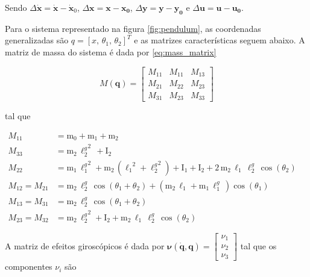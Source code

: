 \documentclass[a4paper, twoside, fleqn]{article}
\begin{document}
    Sendo $\Delta \mathbf{\dot x} = \mathbf{\dot x} - \mathbf{\dot x}_0$, $\Delta \mathbf{x} = \mathbf{x} - \mathbf{x_0}$, $\Delta \mathbf{y} = \mathbf{y} - \mathbf{y_0}$ e $\Delta \mathbf{u} = \mathbf{u} - \mathbf{u_0}$. 
    
    Para o sistema representado na figura \ref{fig:pendulum}, as coordenadas generalizadas são $q = [x, \, \theta_1, \, \theta_2]^T$ e as matrizes características seguem abaixo. A matriz de massa do sistema é dada por \eqref{eq:mass_matrix}

    \begin{equation}
        M(\mathbf{q}) = 
        \begin{bmatrix}
            M_{11} & M_{11} & M_{13} \\
            M_{21} & M_{22} & M_{23}\\
            M_{31} & M_{23} & M_{33}
        \end{bmatrix}
        \label{eq:mass_matrix}
    \end{equation}
    
    tal que
    
    \begin{subequations}
         \begin{align}
            M_{11} &= \mathrm{m_0} + \mathrm{m_1} + \mathrm{m_2} \\
            M_{33} &= \mathrm{m_2}\, {\ell_{2}^g}^2\, + \mathrm{I_2} \\
            M_{22} &= \mathrm{m_1}\, {\ell_{1}^g}^2 + \mathrm{m_2}\, ({\mathrm{\ell_1}}^2 + {\ell_{2}^g}^2) + \mathrm{I_1} + \mathrm{I_2} + 2\, \mathrm{m_2}\, \mathrm{\ell_1}\, \ell_{2}^g\, \cos\!\left(\theta_2\right) \\
            M_{12} = M_{21} &= \mathrm{m_2}\, \ell_{2}^g\, \cos\!\left(\theta_1 + \theta_2\right) + (\mathrm{m_2}\,\mathrm{\ell_1} + \mathrm{m_1}\,\ell_{1}^g\,) \cos\!\left(\theta_1\right) \\
            M_{13} = M_{31} &= \mathrm{m_2}\, \ell_{2}^g\, \cos\!\left(\theta_1 + \theta_2\right) \\
            M_{23} = M_{32} &= \mathrm{m_2}\, {\ell_{2}^g}^2 + \mathrm{I_2} + \mathrm{m_2}\,\mathrm{\ell_1}\, \ell_{2}^g \, \cos\!\left(\theta_2\right)
         \end{align}
         \phantom{\hspace{6cm}}
    \end{subequations}
    
    A matriz de efeitos giroscópicos é dada por $\mathbf{\nu}(\mathbf{\dot q}, \mathbf{q}) = \begin{bmatrix}  \nu_1 \\ \nu_2 \\\nu_3 \end{bmatrix}$ tal que os componentes $\nu_i$ são
    
\end{document}
